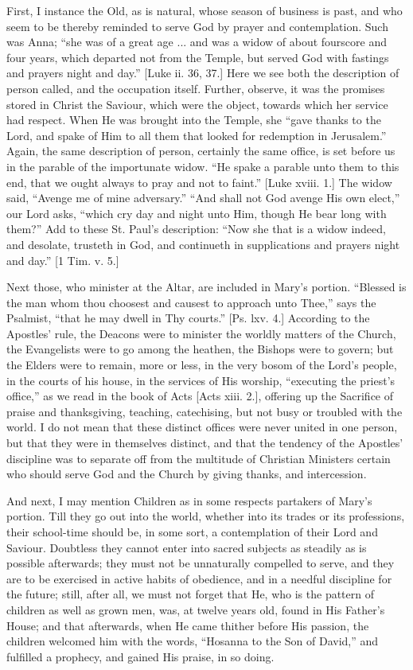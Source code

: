 First, I instance the Old, as is natural, whose season of business
is past, and who seem to be thereby reminded to serve God by prayer
and contemplation. Such was Anna; ``she was of a great age ... and
was a widow of about fourscore and four years, which departed not from
the Temple, but served God with fastings and prayers night and
day.'' [Luke ii. 36, 37.] Here we see both the description of
person called, and the occupation itself. Further, observe, it was the
promises stored in Christ the Saviour, which were the object, towards
which her service had respect. When He was brought into the Temple,
she ``gave thanks to the Lord, and spake of Him to all them that
looked for redemption in Jerusalem.'' Again, the same description
of person, certainly the same office, is set before us in the parable
of the importunate widow. ``He spake a parable unto them to this
end, that we ought always to pray and not to faint.'' [Luke xviii.
1.] The widow said, ``Avenge me of mine adversary.'' ``And
shall not God avenge His own elect,'' our Lord asks, ``which
cry day and night unto Him, though He bear long with them?'' Add
to these St. Paul's description: ``Now she that is a widow
indeed, and desolate, trusteth in God, and continueth in supplications
and prayers night and day.'' [1 Tim. v. 5.]

Next those, who minister at the Altar, are included in Mary's
portion. ``Blessed is the man whom thou choosest and causest to
approach unto Thee,'' says the Psalmist, ``that he may dwell
in Thy courts.'' [Ps. lxv. 4.] According to the Apostles' rule,
the Deacons were to minister the worldly matters of the Church, the
Evangelists were to go among the heathen, the Bishops were to govern;
but the Elders were to remain, more or less, in the very bosom of the
Lord's people, in the courts of his house, in the services of His
worship, ``executing the priest's office,'' as we read in
the book of Acts [Acts xiii. 2.], offering up the Sacrifice of praise
and thanksgiving, teaching, catechising, but not busy or troubled with
the world. I do not mean that these distinct offices were never united
in one person, but that they were in themselves distinct, and that the
tendency of the Apostles' discipline was to separate off from the
multitude of Christian Ministers certain who should serve God and the
Church by giving thanks, and intercession.

And next, I may mention Children as in some respects partakers of
Mary's portion. Till they go out into the world, whether into its
trades or its professions, their school-time should be, in some sort,
a contemplation of their Lord and Saviour. Doubtless they cannot enter
into sacred subjects as steadily as is possible afterwards; they must
not be unnaturally compelled to serve, and they are to be exercised in
active habits of obedience, and in a needful discipline for the
future; still, after all, we must not forget that He, who is the
pattern of children as well as grown men, was, at twelve years old,
found in His Father's House; and that afterwards, when He came
thither before His passion, the children welcomed him with the words,
``Hosanna to the Son of David,'' and fulfilled a prophecy, and
gained His praise, in so doing.

